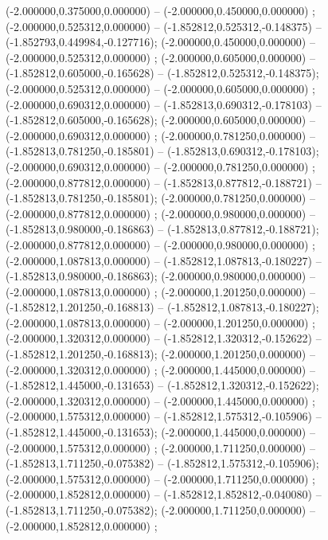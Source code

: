  (-2.000000,0.375000,0.000000) -- (-2.000000,0.450000,0.000000) ;
 (-2.000000,0.525312,0.000000) -- (-1.852812,0.525312,-0.148375) -- (-1.852793,0.449984,-0.127716);
 (-2.000000,0.450000,0.000000) -- (-2.000000,0.525312,0.000000) ;
 (-2.000000,0.605000,0.000000) -- (-1.852812,0.605000,-0.165628) -- (-1.852812,0.525312,-0.148375);
 (-2.000000,0.525312,0.000000) -- (-2.000000,0.605000,0.000000) ;
 (-2.000000,0.690312,0.000000) -- (-1.852813,0.690312,-0.178103) -- (-1.852812,0.605000,-0.165628);
 (-2.000000,0.605000,0.000000) -- (-2.000000,0.690312,0.000000) ;
 (-2.000000,0.781250,0.000000) -- (-1.852813,0.781250,-0.185801) -- (-1.852813,0.690312,-0.178103);
 (-2.000000,0.690312,0.000000) -- (-2.000000,0.781250,0.000000) ;
 (-2.000000,0.877812,0.000000) -- (-1.852813,0.877812,-0.188721) -- (-1.852813,0.781250,-0.185801);
 (-2.000000,0.781250,0.000000) -- (-2.000000,0.877812,0.000000) ;
 (-2.000000,0.980000,0.000000) -- (-1.852813,0.980000,-0.186863) -- (-1.852813,0.877812,-0.188721);
 (-2.000000,0.877812,0.000000) -- (-2.000000,0.980000,0.000000) ;
 (-2.000000,1.087813,0.000000) -- (-1.852812,1.087813,-0.180227) -- (-1.852813,0.980000,-0.186863);
 (-2.000000,0.980000,0.000000) -- (-2.000000,1.087813,0.000000) ;
 (-2.000000,1.201250,0.000000) -- (-1.852812,1.201250,-0.168813) -- (-1.852812,1.087813,-0.180227);
 (-2.000000,1.087813,0.000000) -- (-2.000000,1.201250,0.000000) ;
 (-2.000000,1.320312,0.000000) -- (-1.852812,1.320312,-0.152622) -- (-1.852812,1.201250,-0.168813);
 (-2.000000,1.201250,0.000000) -- (-2.000000,1.320312,0.000000) ;
 (-2.000000,1.445000,0.000000) -- (-1.852812,1.445000,-0.131653) -- (-1.852812,1.320312,-0.152622);
 (-2.000000,1.320312,0.000000) -- (-2.000000,1.445000,0.000000) ;
 (-2.000000,1.575312,0.000000) -- (-1.852812,1.575312,-0.105906) -- (-1.852812,1.445000,-0.131653);
 (-2.000000,1.445000,0.000000) -- (-2.000000,1.575312,0.000000) ;
 (-2.000000,1.711250,0.000000) -- (-1.852813,1.711250,-0.075382) -- (-1.852812,1.575312,-0.105906);
 (-2.000000,1.575312,0.000000) -- (-2.000000,1.711250,0.000000) ;
 (-2.000000,1.852812,0.000000) -- (-1.852812,1.852812,-0.040080) -- (-1.852813,1.711250,-0.075382);
 (-2.000000,1.711250,0.000000) -- (-2.000000,1.852812,0.000000) ;
